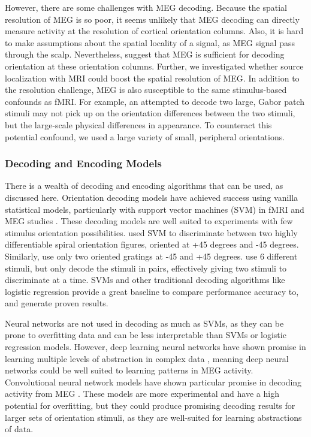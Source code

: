 \documentclass[../main.tex]{subfiles}
\begin{document}
However, there are some challenges with MEG decoding. Because the spatial resolution of MEG is so poor, it seems unlikely that MEG decoding can directly measure activity at the resolution of cortical orientation columns. Also, it is hard to make assumptions about the spatial locality of a signal, as MEG signal pass through the scalp. Nevertheless, \cite{cichy_ramirez_pantazis_2015, pantazis_fang_qin_mohsenzadeh_li_cichy_2018} suggest that MEG is sufficient for decoding orientation at these orientation columns. Further, we investigated whether source localization with MRI could boost the spatial resolution of MEG. In addition to the resolution challenge, MEG is also susceptible to the same stimulus-based confounds as fMRI. For example, an attempted to decode two large, Gabor patch stimuli may not pick up on the orientation differences between the two stimuli, but the large-scale physical differences in appearance. To counteract this potential confound, we used a large variety of small, peripheral orientations. 

\subsubsection{Decoding and Encoding Models}
There is a wealth of decoding and encoding algorithms that can be used, as discussed here. Orientation decoding models have achieved success using vanilla statistical models, particularly with support vector machines (SVM) in fMRI \citep{mannion_mcdonald_clifford_2009} and MEG studies \citep{cichy_ramirez_pantazis_2015, pantazis_fang_qin_mohsenzadeh_li_cichy_2018}. These decoding models are well suited to experiments with few stimulus orientation possibilities. \cite{mannion_mcdonald_clifford_2009} used SVM to discriminate between two highly differentiable spiral orientation figures, oriented at +45 degrees and -45 degrees. Similarly, \cite{cichy_ramirez_pantazis_2015} use only two oriented gratings at -45 and +45 degrees. \cite{pantazis_fang_qin_mohsenzadeh_li_cichy_2018} use 6 different stimuli, but only decode the stimuli in pairs, effectively giving two stimuli to discriminate at a time. SVMs and other traditional decoding algorithms like logistic regression provide a great baseline to compare performance accuracy to, and generate proven results.

Neural networks are not used in decoding as much as SVMs, as they can be prone to overfitting data and can be less interpretable than SVMs or logistic regression models. However, deep learning neural networks have shown promise in learning multiple levels of abstraction in complex data \cite{lecun_bengio_hinton_2015}, meaning deep neural networks could be well suited to learning patterns in MEG activity. Convolutional neural network models have shown particular promise in decoding activity from MEG \citep{seeliger_2018}. These models are more experimental and have a high potential for overfitting, but they could produce promising decoding results for larger sets of orientation stimuli, as they are well-suited for learning abstractions of data. 
\end{document}
